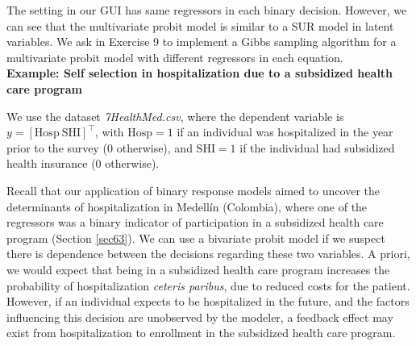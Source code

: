 The setting in our GUI has same regressors in each binary decision. However, we can see that the multivariate probit model is similar to a SUR model in latent variables. We ask in Exercise 9 to implement a Gibbs sampling algorithm for a multivariate probit model with different regressors in each equation.\\

\textbf{Example: Self selection in hospitalization due to a subsidized health care program}

We use the dataset \textit{7HealthMed.csv}, where the dependent variable is $y = \left[\text{Hosp} \ \text{SHI}\right]^{\top}$, with $\text{Hosp} = 1$ if an individual was hospitalized in the year prior to the survey (0 otherwise), and $\text{SHI} = 1$ if the individual had subsidized health insurance (0 otherwise).

Recall that our application of binary response models aimed to uncover the determinants of hospitalization in Medellín (Colombia), where one of the regressors was a binary indicator of participation in a subsidized health care program (Section \ref{sec63}). We can use a bivariate probit model if we suspect there is dependence between the decisions regarding these two variables. A priori, we would expect that being in a subsidized health care program increases the probability of hospitalization \textit{ceteris paribus}, due to reduced costs for the patient. However, if an individual expects to be hospitalized in the future, and the factors influencing this decision are unobserved by the modeler, a feedback effect may exist from hospitalization to enrollment in the subsidized health care program.


